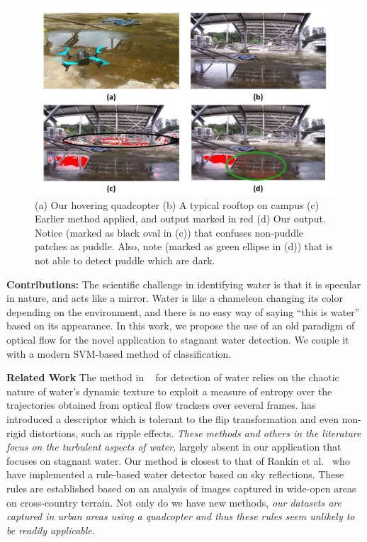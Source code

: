 \begin{figure}[h!]
\centering
\includegraphics[width=\linewidth]{figures/stagnantWater/teaser.pdf}
\caption[Overview]{(a) Our hovering quadcopter (b) A
typical rooftop on campus (c) Earlier method \cite{rankin2004daytime} applied, and
  output marked in red (d) Our output. Notice (marked as black oval in
  (c)) that \cite{rankin2004daytime} confuses non-puddle patches as puddle.
  Also, note (marked as green ellipse in (d)) that \cite{rankin2004daytime} is
  not able to detect puddle which are dark.}
\label{fig:stagnantTeaser}  
\end{figure}

\textbf{Contributions:} The scientific challenge in identifying water
is that it is specular in nature, and acts like a mirror.  Water is
like a chameleon changing its color depending on the environment, and
there is no easy way of saying ``this is water'' based on its
appearance. In this work, we propose the use of an old paradigm of
optical flow for the novel application to stagnant water detection.
We couple it with a modern SVM-based method of classification.

\textbf{Related Work} The method in ~\cite{santana12} for detection of
water relies on the chaotic nature of water's dynamic texture to
exploit a measure of entropy over the trajectories obtained from
optical flow trackers over several frames. \cite{zhang10} has
introduced a descriptor which is tolerant to the flip transformation
and even non-rigid distortions, such as ripple effects.  \emph{These
  methods and others in the literature focus on the turbulent aspects
  of water}, largely absent in our application that focuses on
stagnant water.  Our method is closest to that of Rankin et
al.~\cite{rankin2004daytime, rankin11} who have implemented a rule-based water
detector based on sky reflections.  These rules are established
based on an analysis of images captured in wide-open areas on
cross-country terrain. Not only do we have new methods, \emph{our
datasets are captured in urban areas using a quadcopter and thus these
rules seem unlikely to be readily applicable.}

